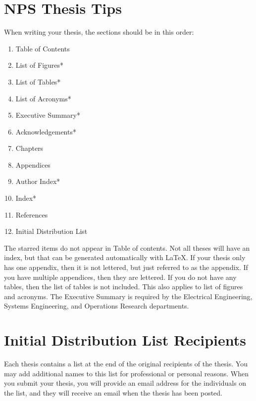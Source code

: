 \section{NPS Thesis Tips}

When writing your thesis, the sections should be in this order:
\begin{enumerate}
  \item Table of Contents
  \item List of Figures*
  \item List of Tables*
  \item List of Acronyms*
  \item Executive Summary*
  \item Acknowledgements*
  \item Chapters
  \item Appendices
  \item Author Index*
  \item Index*
  \item References
  \item Initial Distribution List
\end{enumerate}

The starred items do not appear in Table of contents.  Not all theses
will have an index, but that can be generated automatically with
\LaTeX{}.  If your thesis only has one appendix, then it is not
lettered, but just referred to as the appendix.  If you have multiple
appendices, then they are lettered.  If you do not have any tables,
then the list of tables is not included.  This also applies to list of
figures and acronyms.  The Executive Summary is required by the
Electrical Engineering, Systems Engineering, and Operations Research
departments.

\section{Initial Distribution List Recipients}
Each thesis contains a list at the end of the original recipients of the thesis.  You may 
add additional names to this list for professional or personal reasons.  When you submit your
thesis, you will provide an email address for the individuals on the list, and they will 
receive an email when the thesis has been posted.

